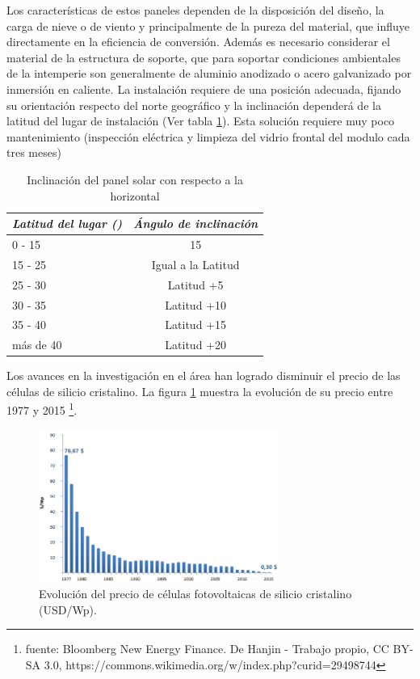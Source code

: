 Los características de estos paneles dependen de la disposición del diseño, la carga de nieve o de viento y principalmente de la pureza del material, que influye directamente en la eficiencia de conversión. Además es necesario considerar el material de la estructura de soporte, que para soportar condiciones ambientales de la intemperie son generalmente de aluminio anodizado o acero galvanizado por inmersión en caliente. La instalación requiere de una posición adecuada, fijando su orientación respecto del norte geográfico y la inclinación dependerá de la latitud del lugar de instalación (Ver tabla \ref{tab:inclina}). Esta solución requiere muy poco mantenimiento (inspección eléctrica y limpieza del vidrio frontal del modulo cada tres meses)

\begin{table}[ht]
	\centering
	\caption{Inclinación del panel solar con respecto a la horizontal}
	\begin{tabular}{@{} l *1c @{}}    \toprule
		\emph{\textbf{Latitud del lugar (\grados)}} & \emph{\textbf{Ángulo de inclinación}}\\
		\midrule
		0 - 15	& 15\grados	\\	
		15 - 25 	& Igual a la Latitud\\
		25 - 30	& Latitud +5\grados\\
		30 - 35	& Latitud +10\grados\\
		35 - 40	& Latitud +15\grados\\
		más de 40	& Latitud +20\grados\\
		\bottomrule
		\hline
	\end{tabular}
	\label{tab:inclina}
\end{table}

Los avances en la investigación en el área han logrado disminuir el precio de las células de silicio cristalino. La figura \ref{fig:swanson} muestra la evolución de su precio entre 1977 y 2015 \footnote{fuente: Bloomberg New Energy Finance. De Hanjin - Trabajo propio, CC BY-SA 3.0, https://commons.wikimedia.org/w/index.php?curid=29498744}.


\begin{figure}[h!]
	\centering
    \includegraphics[width=0.7\textwidth]{./Figures/SwansonEffect.png}
    	\caption{Evolución del precio de células fotovoltaicas de silicio cristalino (USD/Wp).}
	\label{fig:swanson}
\end{figure}

